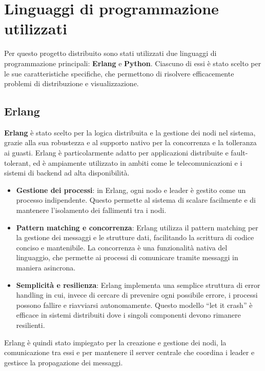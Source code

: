 \documentclass[12pt, a4paper]{report}
\begin{document}
\section{Linguaggi di programmazione utilizzati}

Per questo progetto distribuito sono stati utilizzati due linguaggi di programmazione principali: \textbf{Erlang} e \textbf{Python}. Ciascuno di essi è stato scelto per le sue caratteristiche specifiche, che permettono di risolvere efficacemente problemi di distribuzione e visualizzazione.

\subsection{Erlang}

\textbf{Erlang} è stato scelto per la logica distribuita e la gestione dei nodi nel sistema, grazie alla sua robustezza e al supporto nativo per la concorrenza e la tolleranza ai guasti. Erlang è particolarmente adatto per applicazioni distribuite e fault-tolerant, ed è ampiamente utilizzato in ambiti come le telecomunicazioni e i sistemi di backend ad alta disponibilità.

\begin{itemize}
    \item \textbf{Gestione dei processi}: in Erlang, ogni nodo e leader è gestito come un processo indipendente. Questo permette al sistema di scalare facilmente e di mantenere l'isolamento dei fallimenti tra i nodi.
    \item \textbf{Pattern matching e concorrenza}: Erlang utilizza il pattern matching per la gestione dei messaggi e le strutture dati, facilitando la scrittura di codice conciso e mantenibile. La concorrenza è una funzionalità nativa del linguaggio, che permette ai processi di comunicare tramite messaggi in maniera asincrona.
    \item \textbf{Semplicità e resilienza}: Erlang implementa una semplice struttura di error handling in cui, invece di cercare di prevenire ogni possibile errore, i processi possono fallire e riavviarsi autonomamente. Questo modello “let it crash” è efficace in sistemi distribuiti dove i singoli componenti devono rimanere resilienti.
\end{itemize}

Erlang è quindi stato impiegato per la creazione e gestione dei nodi, la comunicazione tra essi e per mantenere il server centrale che coordina i leader e gestisce la propagazione dei messaggi.
\end{document}
